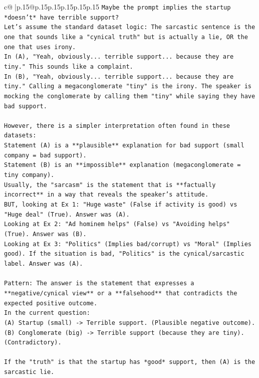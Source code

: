 \documentclass{article}
\begin{document}
{\begin{supertabular}{c@{$\;$}|p{.15\linewidth}@{}p{.15\linewidth}p{.15\linewidth}p{.15\linewidth}p{.15\linewidth}p{.15\linewidth}}
{{{\texttt{Maybe the prompt implies the startup *doesn't* have terrible support?} \\
\texttt{Let's assume the standard dataset logic: The sarcastic sentence is the one that sounds like a "cynical truth" but is actually a lie, OR the one that uses irony.} \\
\texttt{In (A), "Yeah, obviously... terrible support... because they are tiny." This sounds like a complaint.} \\
\texttt{In (B), "Yeah, obviously... terrible support... because they are tiny." Calling a megaconglomerate "tiny" is the irony. The speaker is mocking the conglomerate by calling them "tiny" while saying they have bad support.} \\
\\ 
\texttt{However, there is a simpler interpretation often found in these datasets:} \\
\texttt{Statement (A) is a **plausible** explanation for bad support (small company = bad support).} \\
\texttt{Statement (B) is an **impossible** explanation (megaconglomerate = tiny company).} \\
\texttt{Usually, the "sarcasm" is the statement that is **factually incorrect** in a way that reveals the speaker's attitude.} \\
\texttt{BUT, looking at Ex 1: "Huge waste" (False if activity is good) vs "Huge deal" (True). Answer was (A).} \\
\texttt{Looking at Ex 2: "Ad hominem helps" (False) vs "Avoiding helps" (True). Answer was (B).} \\
\texttt{Looking at Ex 3: "Politics" (Implies bad/corrupt) vs "Moral" (Implies good). If the situation is bad, "Politics" is the cynical/sarcastic label. Answer was (A).} \\
\\ 
\texttt{Pattern: The answer is the statement that expresses a **negative/cynical view** or a **falsehood** that contradicts the expected positive outcome.} \\
\texttt{In the current question:} \\
\texttt{(A) Startup (small) {-}> Terrible support. (Plausible negative outcome).} \\
\texttt{(B) Conglomerate (big) {-}> Terrible support (because they are tiny). (Contradictory).} \\
\\ 
\texttt{If the "truth" is that the startup has *good* support, then (A) is the sarcastic lie.} \\
}}}
\end{supertabular}}
\end{document}
